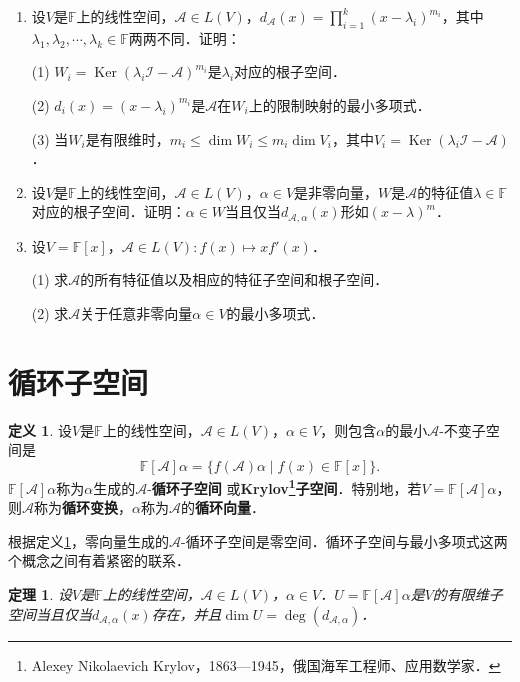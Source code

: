 \documentclass[a4paper,fontset=windows]{ctexbook}
\newtheorem{theorem}{定理}[chapter]
\theoremstyle{definition}
\newtheorem{definition}{定义}[chapter]
\DeclareMathOperator{\Ker}{Ker}
\renewcommand{\le}{\leqslant}
\begin{document}
\begin{enumerate}
\item 设$V$是$\mathbb{F}$上的线性空间，$\mathcal{A}\in L(V)$，$d_{\mathcal{A}}(x)=\prod\limits_{i=1}^k(x-\lambda_i)^{m_i}$，其中$\lambda_1,\lambda_2,\cdots,\lambda_k\in\mathbb{F}$两两不同．证明：

(1) $W_i=\Ker(\lambda_i\mathcal{I-A})^{m_i}$是$\lambda_i$对应的根子空间．

(2) $d_i(x)=(x-\lambda_i)^{m_i}$是$\mathcal{A}$在$W_i$上的限制映射的最小多项式．

(3) 当$W_i$是有限维时，$m_i\le\dim W_i\le m_i\dim V_i$，其中$V_i=\Ker(\lambda_i\mathcal{I-A})$．

\item 设$V$是$\mathbb{F}$上的线性空间，$\mathcal{A}\in L(V)$，$\alpha\in V$是非零向量，$W$是$\mathcal{A}$的特征值$\lambda\in\mathbb{F}$对应的根子空间．证明：$\alpha\in W$当且仅当$d_{\mathcal{A},\alpha}(x)$形如$(x-\lambda)^m$．

\item 设$V=\mathbb{F}[x]$，$\mathcal{A}\in L(V):f(x)\mapsto xf'(x)$．

(1) 求$\mathcal{A}$的所有特征值以及相应的特征子空间和根子空间．

(2) 求$\mathcal{A}$关于任意非零向量$\alpha\in V$的最小多项式．

\end{enumerate}

\clearpage\section{循环子空间}

\begin{definition}\label{def9.15}
设$V$是$\mathbb{F}$上的线性空间，$\mathcal{A}\in L(V)$，$\alpha\in V$，则包含$\alpha$的最小$\mathcal{A}$-不变子空间是
$$\mathbb{F}[\mathcal{A}]\alpha=\{f(\mathcal{A})\alpha\mid f(x)\in\mathbb{F}[x]\}.$$
$\mathbb{F}[\mathcal{A}]\alpha$称为$\alpha$生成的$\mathcal{A}$-{\bf 循环子空间} 或{\bf Krylov\footnote{Alexey Nikolaevich Krylov，1863—1945，俄国海军工程师、应用数学家．}子空间}．特别地，若$V=\mathbb{F}[\mathcal{A}]\alpha$，则$\mathcal{A}$称为{\bf 循环变换}，$\alpha$称为$\mathcal{A}$的{\bf 循环向量}．
\end{definition}

根据定义\ref{def9.15}，零向量生成的$\mathcal{A}$-循环子空间是零空间．循环子空间与最小多项式这两个概念之间有着紧密的联系．

\begin{theorem}
设$V$是$\mathbb{F}$上的线性空间，$\mathcal{A}\in L(V)$，$\alpha\in V$．$U=\mathbb{F}[\mathcal{A}]\alpha$是$V$的有限维子空间当且仅当$d_{\mathcal{A},\alpha}(x)$存在，并且$\dim U=\deg(d_{\mathcal{A},\alpha})$．
\end{theorem}
\end{document}
